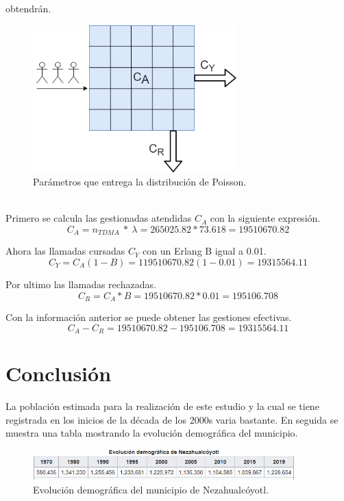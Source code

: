 \documentclass[11pt,letterpaper]{article}
\begin{document}
obtendrán.
\\ 
\begin{figure}[ht]
    \centering
    \includegraphics[width=0.7\textwidth]{imagenes/t34.png}
    \caption{Parámetros que entrega la distribución de Poisson.}
\end{figure}
\\ 
Primero se calcula las gestionadas atendidas $C_{A}$ con la siguiente expresión.
\begin{equation}
    C_A=n_{TDMA} \ * \ \lambda = 265025.82 * 73.618=19510670.82
\end{equation}

Ahora las llamadas cursadas $C_Y$ con un Erlang B igual a 0.01.
\begin{equation}
    C_Y=C_A(1-B)=119510670.82(1-0.01)=19315564.11
\end{equation}

Por ultimo las llamadas rechazadas.
\begin{equation}
    C_R=C_A*B=19510670.82*0.01=195106.708
\end{equation}

Con la información anterior se puede obtener las gestiones efectivas.
\begin{equation}
    C_A-C_R=19510670.82-195106.708=19315564.11
\end{equation}

\newpage
\section{Conclusión}
La población estimada para la realización de este estudio y la cual se tiene registrada 
en los inicios de la década de los 2000s varia bastante. En seguida se muestra una 
tabla mostrando la evolución demográfica del municipio.
\begin{figure}[ht]
    \centering
    \includegraphics[width=0.9\textwidth]{imagenes/t31.png}
    \caption{Evolución demográfica del municipio de Nezahualcóyotl.}
\end{figure}
\end{document}
